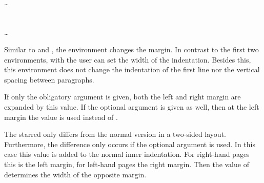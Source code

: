 \begin{Declaration}
  \\
  \quad\dots\\
  \\
  \\
  \quad\dots\\
\end{Declaration}
%
%
Similar to  and %
%
, the  environment changes the margin.
In contrast to the first two environments, with  the
user can set the width of the indentation. Besides this, this environment does
not change the indentation of the first line nor the vertical spacing between
paragraphs.

If only the obligatory argument  is given, both the
left and right margin are expanded by this value. If the optional
argument  is given as well, then at the left
margin the value  is used instead of
.

The starred  only differs from the normal
version in a two-sided layout. Furthermore, the difference only occurs
if the optional argument  is used. In this
case this value  is added to the normal inner
indentation. For right-hand pages this is the left margin, for
left-hand pages the right margin. Then the value of
 determines the width of the opposite margin.

